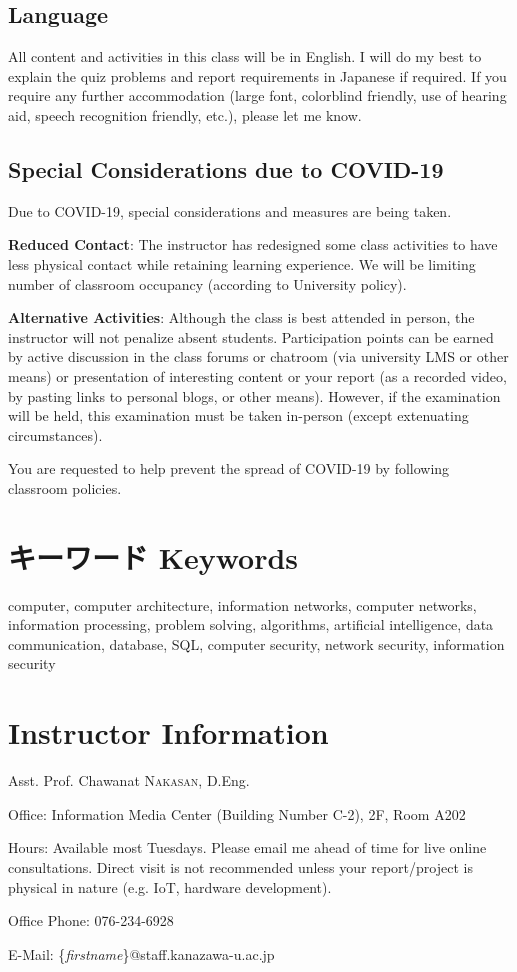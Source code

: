\documentclass[a4paper]{article}
\begin{document}
\subsection{Language}

All content and activities in this class will be in English. I will do my best to explain the quiz problems and report requirements in Japanese if required. If you require any further accommodation (large font, colorblind friendly, use of hearing aid, speech recognition friendly, etc.), please let me know.

\subsection{Special Considerations due to COVID-19}

Due to COVID-19, special considerations and measures are being taken.

\textbf{Reduced Contact}: The instructor has redesigned some class activities to have less physical contact while retaining learning experience. We will be limiting number of classroom occupancy (according to University policy).

\textbf{Alternative Activities}: Although the class is best attended in person, the instructor will not penalize absent students. Participation points can be earned by active discussion in the class forums or chatroom (via university LMS or other means) or presentation of interesting content or your report (as a recorded video, by pasting links to personal blogs, or other means). However, if the examination will be held, this examination must be taken in-person (except extenuating circumstances).

You are requested to help prevent the spread of COVID-19 by following classroom policies.

\section{キーワード Keywords}
computer, computer architecture, information networks, computer networks, information processing, problem solving, algorithms, artificial intelligence, data communication, database, SQL, computer security, network security, information security

\section*{Instructor Information}
Asst. Prof. Chawanat \textsc{Nakasan}, D.Eng.

\smallskip\noindent
Office: Information Media Center (Building Number C-2), 2F, Room A202

\smallskip\noindent
Hours: Available most Tuesdays. Please email me ahead of time for live online consultations. Direct visit is not recommended unless your report/project is physical in nature (e.g. IoT, hardware development).

\smallskip\noindent
Office Phone: 076-234-6928

\smallskip\noindent
E-Mail: \{\textit{firstname}\}@staff.kanazawa-u.ac.jp
\end{document}
